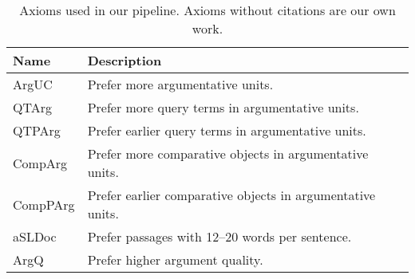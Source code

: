 \begin{table}
    \caption{Axioms used in our pipeline. Axioms without citations are our own work.}
    \label{table-axioms}
    \begin{tabular}{ll}
        \toprule
        \textbf{Name} & \textbf{Description} \\
        \midrule
        ArgUC~\cite{BondarenkoHVSPB2018} & Prefer more argumentative units. \\
        QTArg~\cite{BondarenkoHVSPB2018} & Prefer more query terms in argumentative units. \\
        QTPArg~\cite{BondarenkoHVSPB2018} & Prefer earlier query terms in argumentative units. \\
        CompArg & Prefer more comparative objects in argumentative units. \\
        CompPArg & Prefer earlier comparative objects in argumentative units. \\
        aSLDoc~\cite{BondarenkoFKHVS2019} & Prefer passages with 12--20 words per sentence. \\
        ArgQ & Prefer higher argument quality. \\ 
        \bottomrule
    \end{tabular}
\end{table}

